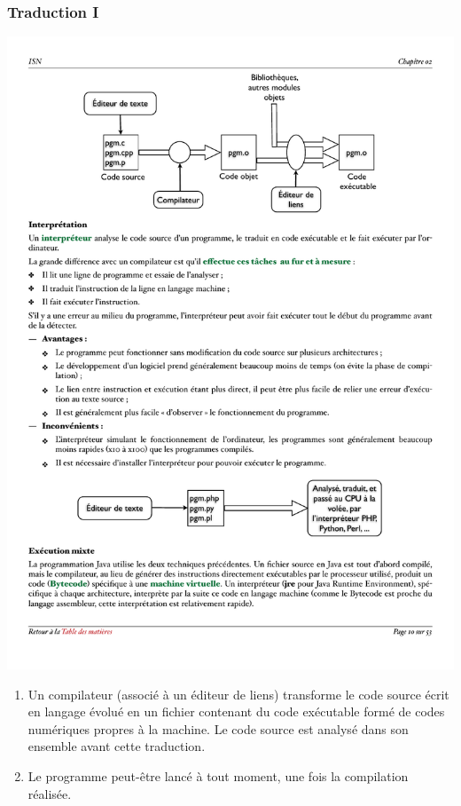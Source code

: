 \documentclass[utf8,10pt]{beamer}
\begin{document}
\begin{frame}
    \frametitle{Traduction I}
    \begin{block}{}
    \begin{center}
        \includegraphics[scale=0.5]{./images/Compilation}
    \end{center}
    \end{block}
    
    \begin{enumerate}
        \item Un compilateur (associé à un éditeur de liens) transforme le code source écrit en langage 
        évolué en un fichier contenant du code exécutable formé de codes numériques propres à la machine. 
        \alert{Le code source
         est analysé dans son ensemble avant cette traduction}.
         \item Le programme peut-être lancé à tout moment, une fois la compilation réalisée.
    \end{enumerate}
\end{frame}
\end{document}
